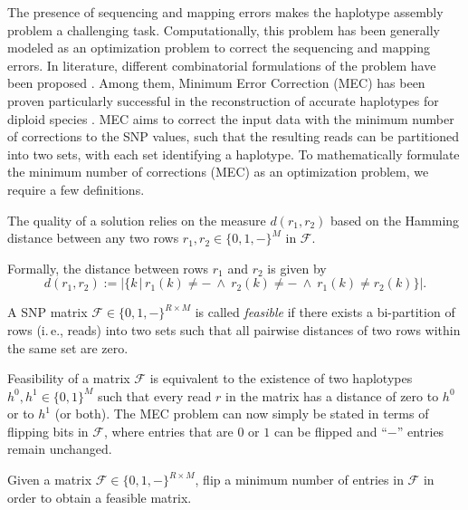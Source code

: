 The presence of sequencing and mapping errors makes the haplotype assembly problem a challenging task. 
Computationally, this problem has been generally modeled as an optimization problem to correct the sequencing and mapping errors.
In literature, different combinatorial formulations of the problem have been
proposed \citep{lippert2002algorithmic}. Among them, Minimum Error Correction (MEC) \citep{lippert2002algorithmic} has
been proven particularly successful in the reconstruction of accurate haplotypes for
diploid species \citep{martin2016whatshap, he2010optimal, CDW13_exact, Glusman2014, rhee2016survey}. MEC aims to correct the input data with the minimum
number of corrections to the SNP values, such that the resulting reads can be partitioned into two sets, with each set identifying a haplotype. 
To mathematically formulate the minimum number of corrections (MEC) as an optimization problem, we require a few definitions.

The quality of a solution relies on the measure $d(r_1,r_2)$ based on the Hamming distance between any two rows $r_1,r_2\in\{0,1, -\}^M$ in $\mathcal{F}$.
\begin{definition}[Distance] 
 Formally, the distance between rows $r_1$ and $r_2$ is given by
\[d(r_1,r_2):= \big|\big\{k\,\big|\,r_1(k)\neq -\ \wedge\ r_2(k)\neq -\ \wedge\ r_1(k)\neq r_2(k)\big\}\big|.\]
\label{eq:distance}
\end{definition}

\begin{definition}[Feasibility]
A SNP matrix $\mathcal{F}\in\{0,1,-\}^{R\times M}$ is called \emph{feasible} if there exists a bi-partition of rows (i.\,e., reads) into two sets such that all pairwise distances of two rows within the same set are zero.
\label{def:feasible-mec}
\end{definition}
Feasibility of a matrix $\mathcal{F}$ is equivalent to the existence of two haplotypes $h^0,h^1\in\{0,1\}^M$ such that every read $r$ in the matrix has a distance of zero to $h^0$ or to $h^1$ (or both).
The MEC problem can now simply be stated in terms of flipping bits in $\mathcal{F}$, where entries that are $0$ or $1$ can be flipped and ``$-$'' entries remain unchanged.

\begin{problem}[MEC]
Given a matrix $\mathcal{F}\in\{0,1,-\}^{R\times M}$, flip a minimum number of entries in $\mathcal{F}$ in order to obtain a feasible matrix.
\label{prob:mec}
\end{problem}


